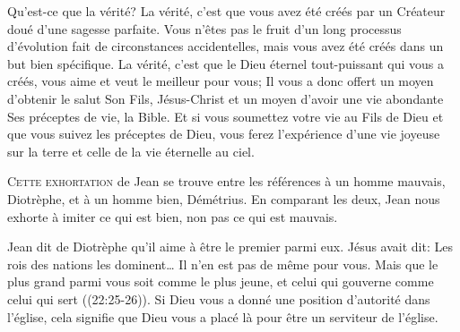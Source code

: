 Qu'est-ce que la vérité? La vérité, c'est que vous avez été créés
 par un Créateur doué d'une sagesse parfaite.
 Vous n'êtes pas le fruit d'un long processus d'évolution
 fait de circonstances accidentelles, mais vous avez été créés
 dans un but bien spécifique. La vérité, c'est que le Dieu éternel
 tout-puissant qui vous a créés, vous aime et veut le meilleur pour vous;
 Il vous a donc offert un moyen d'obtenir le salut
 \ocadr Son Fils, Jésus-Christ \fcadr{} et un moyen d'avoir une vie abondante
 \ocadr Ses préceptes de vie, la Bible.
 Et si vous soumettez votre vie au Fils de Dieu et que vous suivez
 les préceptes de Dieu, vous ferez l'expérience d'une vie joyeuse
 sur la terre et celle de la vie éternelle au ciel. 

\dvrule







\lettrine{C}{ette exhortation} de Jean se trouve entre les références
 à un homme mauvais, Diotrèphe, et à un homme bien, 
 Démétrius.
 En comparant les deux, Jean nous exhorte à imiter ce qui est bien, 
 non pas ce qui est mauvais. 

Jean dit de Diotrèphe qu'il \Og aime à être le premier parmi eux. \Fg{}
 Jésus avait dit: 
 \Og Les rois des nations les dominent\dots{}
 Il n'en est pas de même pour vous. Mais que le plus grand parmi vous
 soit comme le plus jeune, et celui qui gouverne comme celui qui sert \Fg{}
 ((22:25-26)).
 Si Dieu vous a donné une position d'autorité dans l'église,
 cela signifie que Dieu vous a placé là pour être un serviteur de l'église.


